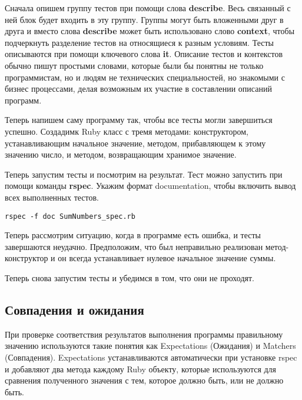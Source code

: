 Сначала опишем группу тестов при помощи слова \textbf{describe}. Весь связанный с ней блок будет входить в эту группу. Группы могут быть вложенными друг в друга и вместо слова \textbf{describe} может быть использовано слово \textbf{context}, чтобы подчеркнуть разделение тестов на относящиеся к разным условиям. Тесты описываются при помощи ключевого слова \textbf{it}. Описание тестов и контекстов обычно пишут простыми словами, которые были бы понятны не только программистам, но и людям не технических специальностей, но знакомыми с бизнес процессами, делая возможным их участие в составлении описаний программ.



Теперь напишем саму программу так, чтобы все тесты могли завершиться успешно. Создадимк Ruby класс с тремя методами: конструктором, устанавливающим начальное значение, методом, прибавляющем к этому значению число, и методом, возвращающим хранимое значение.



Теперь запустим тесты и посмотрим на результат. Тест можно запустить при помощи команды \textbf{rspec}. Укажим формат documentation, чтобы включить вывод всех выполненных тестов.

\begin{verbatim}
rspec -f doc SumNumbers_spec.rb
\end{verbatim}



Теперь рассмотрим ситуацию, когда в программе есть ошибка, и тесты завершаются неудачно. Предположим, что был неправильно реализован метод-конструктор и он всегда устанавливает нулевое начальное значение суммы.



Теперь снова запустим тесты и убедимся в том, что они не проходят.



\subsection{Совпадения и ожидания}

При проверке соответствия результатов выполнения программы правильному значению используются такие понятия как Expectations (Ожидания) и Matchers (Совпадения). Expectations устанавливаются автоматически при установке rspec и добавляют два метода каждому Ruby объекту, которые используются для сравнения полученного значения с тем, которое должно быть, или не должно быть.

